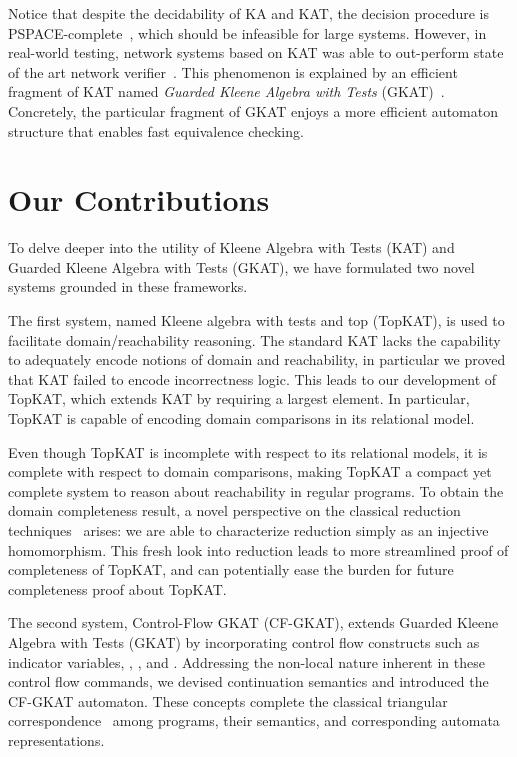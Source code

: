 Notice that despite the decidability of KA and KAT, the decision procedure is PSPACE-complete~\cite{Cohen_Kozen_Smith_1999}, which should be infeasible for large systems.
However, in real-world testing, network systems based on KAT was able to out-perform state of the art network verifier~\cite{Smolka_Kumar_Kahn_Foster_Hsu_Kozen_Silva_2019}.
This phenomenon is explained by an efficient fragment of KAT named \emph{Guarded Kleene Algebra with Tests} (GKAT)~\cite{Smolka_Foster_Hsu_Kappé_Kozen_Silva_2020}. Concretely, the particular fragment of GKAT enjoys a more efficient automaton structure that enables fast equivalence checking.

\section{Our Contributions}



To delve deeper into the utility of Kleene Algebra with Tests (KAT) and Guarded Kleene Algebra with Tests (GKAT), we have formulated two novel systems grounded in these frameworks.

The first system, named Kleene algebra with tests and top (TopKAT), is used to facilitate domain/reachability reasoning.  
The standard KAT lacks the capability to adequately encode notions of domain and reachability, in particular we proved that KAT failed to encode incorrectness logic.
This leads to our development of TopKAT, which extends KAT by requiring a largest element. 
In particular, TopKAT is capable of encoding domain comparisons in its relational model. 

Even though TopKAT is incomplete with respect to its relational models, it is complete with respect to domain comparisons, making TopKAT a compact yet complete system to reason about reachability in regular programs.
To obtain the domain completeness result, a novel perspective on the classical reduction techniques~\cite{Pous_Rot_Wagemaker_2021,Kozen_Smith_1997} arises: we are able to characterize reduction simply as an injective homomorphism. 
This fresh look into reduction leads to more streamlined proof of completeness of TopKAT, and can potentially ease the burden for future completeness proof about TopKAT.

The second system, Control-Flow GKAT (CF-GKAT), extends Guarded Kleene Algebra with Tests (GKAT) by incorporating control flow constructs such as indicator variables, , , and .
Addressing the non-local nature inherent in these control flow commands, we devised continuation semantics and introduced the CF-GKAT automaton.
These concepts complete the classical triangular correspondence~\cite{jacobs_BialgebraicReviewDeterministic_2006,Kozen_2008,Smolka_Foster_Hsu_Kappé_Kozen_Silva_2020} among programs, their semantics, and corresponding automata representations.

